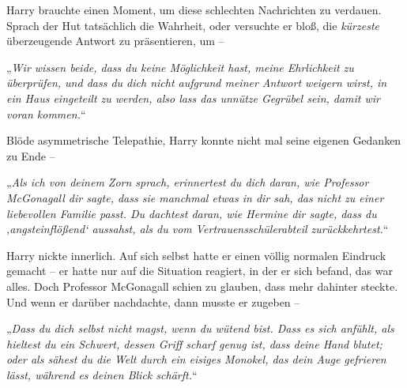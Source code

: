 Harry brauchte einen Moment, um diese schlechten Nachrichten zu verdauen. Sprach der Hut tatsächlich die Wahrheit, oder versuchte er bloß, die \emph{kürzeste} überzeugende Antwort zu präsentieren, um –

„\emph{Wir wissen beide, dass du keine Möglichkeit hast, meine Ehrlichkeit zu überprüfen, und dass du dich nicht aufgrund meiner Antwort weigern wirst, in ein Haus eingeteilt zu werden, also lass das unnütze Gegrübel sein, damit wir voran kommen.}“

Blöde asymmetrische Telepathie, Harry konnte nicht mal seine eigenen Gedanken zu Ende –

„\emph{Als ich von deinem Zorn sprach, erinnertest du dich daran, wie Professor McGonagall dir sagte, dass sie manchmal etwas in dir sah, das nicht zu einer liebevollen Familie passt. Du dachtest daran, wie Hermine dir sagte, dass du ‚angsteinflößend‘ aussahst, als du vom Vertrauensschülerabteil zurückkehrtest.}“

Harry nickte innerlich. Auf sich selbst hatte er einen völlig normalen Eindruck gemacht – er hatte nur auf die Situation reagiert, in der er sich befand, das war alles. Doch Professor McGonagall schien zu glauben, dass mehr dahinter steckte. Und wenn er darüber nachdachte, dann musste er zugeben –

„\emph{Dass du dich selbst nicht magst, wenn du wütend bist. Dass es sich anfühlt, als hieltest du ein Schwert, dessen Griff scharf genug ist, dass deine Hand blutet; oder als sähest du die Welt durch ein eisiges Monokel, das dein Auge gefrieren lässt, während es deinen Blick schärft.}“

